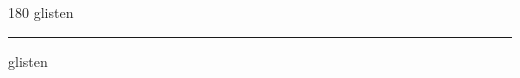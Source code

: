 
\begin{frame}
\begin{center}
\begin{turn}{180}
{\fontsize{2.5cm}{1em}\selectfont glisten}
\end{turn}
\vspace{1em}\par  
\hrule
\vspace{1em}\par  
{\fontsize{2.5cm}{1em}\selectfont glisten}
\end{center}
\end{frame}
